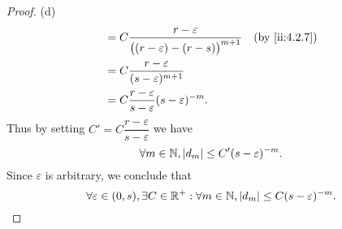 \begin{proof}{(d)}
\begin{align*}
                                & = C \dfrac{r - \varepsilon}{\big((r - \varepsilon) - (r - s)\big)^{m + 1}}                      &  & \by{ii:4.2.7}               \\
                                & = C \dfrac{r - \varepsilon}{(s - \varepsilon)^{m + 1}}                                                                           \\
                                & = C \dfrac{r - \varepsilon}{s - \varepsilon} (s - \varepsilon)^{-m}.
  \end{align*}
  Thus by setting \(C' = C \dfrac{r - \varepsilon}{s - \varepsilon}\) we have
  \[
    \forall m \in \mathbb{N}, \left\lvert d_m\right\rvert \leq C' (s - \varepsilon)^{-m}.
  \]
  Since \(\varepsilon\) is arbitrary, we conclude that
  \[
    \forall \varepsilon \in (0, s), \exists C \in \mathbb{R}^+ : \forall m \in \mathbb{N}, \left\lvert d_m\right\rvert \leq C (s - \varepsilon)^{-m}.
  \]
\end{proof}

